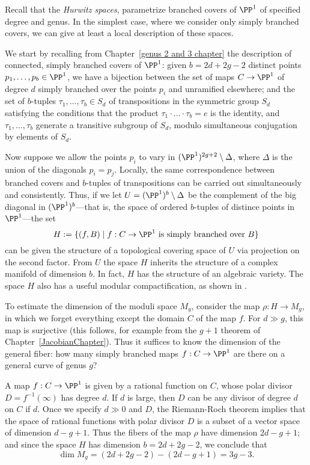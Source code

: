Recall that the \emph{Hurwitz spaces},  parametrize branched covers of $\PP^1$ of specified degree and genus. In the simplest case, where we consider only simply branched covers, we can give at least a local description of these spaces. 

We start by recalling from Chapter~\ref{genus 2 and 3 chapter} the description of connected, simply branched covers of $\PP^1$: given $b = 2d + 2g - 2$ distinct points $p_1,\dots,p_b \in \PP^1$, we have a  bijection between the set of maps $C \to \PP^1$ of degree $d$ simply branched over the points $p_i$ and unramified elsewhere; and the set of $b$-tuples $\tau_1, \dots, \tau_b \in S_d$ of transpositions in the symmetric group $S_d$
satisfying the conditions that the product $\tau_1\cdot \dots \cdot \tau_b = e$ is the identity, and $\tau_1, \dots, \tau_b$ generate a transitive subgroup of $S_d$, modulo simultaneous conjugation by elements of $S_d$. 

Now suppose we allow the points $p_i$ to vary in $(\PP^1)^{2g+2} \setminus \Delta$, where $\Delta$ is the union of the 
diagonals $p_i=p_j$. Locally, the same correspondence between branched covers and $b$-tuples of transpositions can be carried out simultaneously and consistently. Thus, if we let $U = (\PP^1)^b \setminus \Delta$ be the complement of the big diagonal in $(\PP^1)^b$---that is, the space of ordered $b$-tuples of distince points in $\PP^1$---the set
$$
H := \{ (f, B) \mid f : C \to \PP^1 \text{ is simply branched over } B \}
$$
can be given the structure of a topological covering space of $U$ via projection on the second factor. From $U$ the space $H$ inherits the structure of a complex manifold of dimension $b$.
In fact, $H$ has the structure of an algebraic variety. The space $H$ also has a useful modular compactification, as shown in \cite{Harris-Mumford-Moduli}. 

To estimate the dimension of the moduli space $M_g$, consider the map $\rho : H \to M_g$, in which we forget everything except the domain $C$ of the map $f$. For $d \gg g$, this map is surjective (this follows, for example from the $g+1$ theorem of Chapter~\ref{JacobianChapter}). Thus it suffices to know the dimension of the general fiber: how many simply branched maps $f : C \to \PP^1$ are there on a general curve of genus $g$?

A map $f : C \to \PP^1$ is given by a rational function on $C$, whose polar divisor $D = f^{-1}(\infty)$ has degree $d$.
If $d$ is large, then $D$ can be any divisor of degree $d$ on $C$ if $d$. Once we specify $d\gg 0$ and $D$, the Riemann-Roch theorem implies that the space of rational functions with polar divisor $D$ is a subset of a vector space of dimension $d-g+1$. Thus the fibers of the map $\rho$ have dimension $2d-g+1$; and since the space $H$ has dimension $b = 2d+2g-2$, we conclude that
$$
\dim M_g = (2d+2g-2)-(2d-g+1) = 3g-3.
$$


